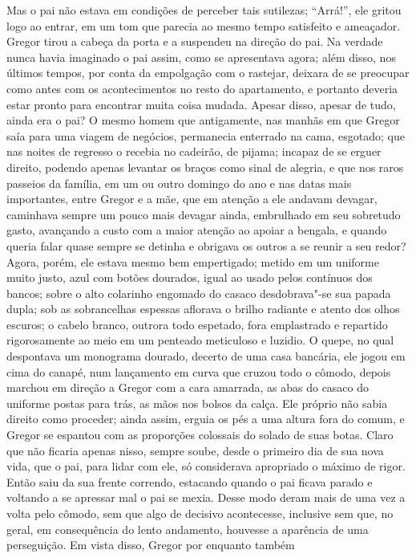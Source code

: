 Mas o pai não estava em condições de perceber tais sutilezas; “Arrá!”, ele
gritou logo ao entrar, em um tom que parecia ao mesmo tempo satisfeito e
ameaçador. Gregor tirou a cabeça da porta e a suspendeu na direção do pai.
Na verdade nunca havia imaginado o pai assim, como se apresentava agora;
além disso, nos últimos tempos, por conta da empolgação com o rastejar,
deixara de se preocupar como antes com os acontecimentos no resto do
apartamento, e portanto deveria estar pronto para encontrar muita coisa
mudada. Apesar disso, apesar de tudo, ainda era o pai? O mesmo homem que
antigamente, nas manhãs em que Gregor saía para uma viagem de negócios,
permanecia enterrado na cama, esgotado; que nas noites de regresso o
recebia no cadeirão, de pijama; incapaz de se erguer direito, podendo
apenas levantar os braços como sinal de alegria, e que nos raros passeios
da família, em um ou outro domingo do ano e nas datas mais importantes,
entre Gregor e a mãe, que em atenção a ele andavam devagar, caminhava
sempre um pouco mais devagar ainda, embrulhado em seu sobretudo gasto,
avançando a custo com a maior atenção ao apoiar a bengala, e quando queria
falar quase sempre se detinha e obrigava os outros a se reunir a seu
redor? Agora, porém, ele estava mesmo bem empertigado; metido em um
uniforme muito justo, azul com botões dourados, igual ao usado pelos
contínuos dos bancos; sobre o alto colarinho engomado do casaco
desdobrava"-se sua papada dupla; sob as sobrancelhas espessas aflorava o
brilho radiante e atento dos olhos escuros; o cabelo branco, outrora todo
espetado, fora emplastrado e repartido rigorosamente ao meio em um
penteado meticuloso e luzidio. O quepe, no qual despontava um monograma
dourado, decerto de uma casa bancária, ele jogou em cima do canapé, num
lançamento em curva que cruzou todo o cômodo, depois marchou em direção a
Gregor com a cara amarrada, as abas do casaco do uniforme postas para
trás, as mãos nos bolsos da calça. Ele próprio não sabia direito como
proceder; ainda assim, erguia os pés a uma altura fora do comum, e Gregor
se espantou com as proporções colossais do solado de suas botas. Claro que
não ficaria apenas nisso, sempre soube, desde o primeiro dia de sua nova
vida, que o pai, para lidar com ele, só considerava apropriado o máximo de
rigor. Então saiu da sua frente correndo, estacando quando o pai ficava
parado e voltando a se apressar mal o pai se mexia. Desse modo deram mais
de uma vez a volta pelo cômodo, sem que algo de decisivo acontecesse,
inclusive sem que, no geral, em consequência do lento andamento, houvesse
a aparência de uma perseguição. Em vista disso, Gregor por enquanto também

